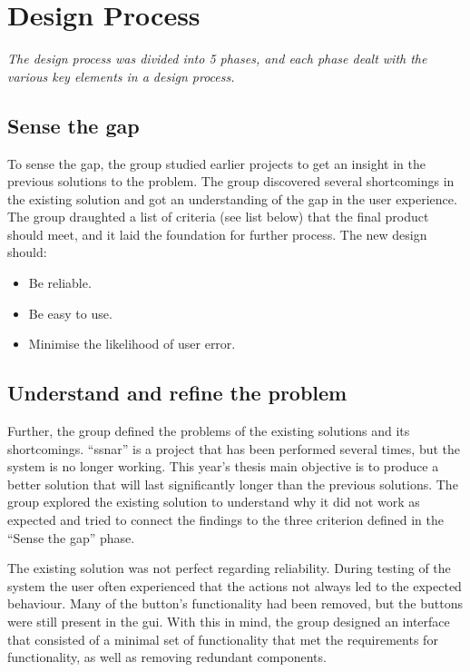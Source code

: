 \section{Design Process}
\label{secr:designproc}
\textit{The design process was divided into 5 phases, and each phase dealt with the various key elements in a design process.}

\subsection{Sense the gap}
\label{sec:sensethegap}
To sense the gap, the group studied earlier projects to get an insight in the previous solutions to the problem. The group discovered several shortcomings in the existing solution and got an understanding of the gap in the user experience. The group draughted a list of criteria (see list below) that the final product should meet, and it laid the foundation for further process. The new design should:

\begin{itemize}
    \item Be reliable.
    \item Be easy to use.
    \item Minimise the likelihood of user error.
\end{itemize}

\subsection{Understand and refine the problem}
\label{sec:understprob}
Further, the group defined the problems of the existing solutions and its shortcomings. ``\acrlong{ssnar}'' is a project that has been performed several times, but the system is no longer working. This year's thesis main objective is to produce a better solution that will last significantly longer than the previous solutions. The group explored the existing solution to understand why it did not work as expected and tried to connect the findings to the three criterion defined in the ``Sense the gap'' phase.

The existing solution was not perfect regarding reliability. During testing of the system the user often experienced that the actions not always led to the expected behaviour. Many of the button's functionality had been removed, but the buttons were still present in the \acrshort{gui}. With this in mind, the group designed an interface that consisted of a minimal set of functionality that met the requirements for functionality, as well as removing redundant components.

